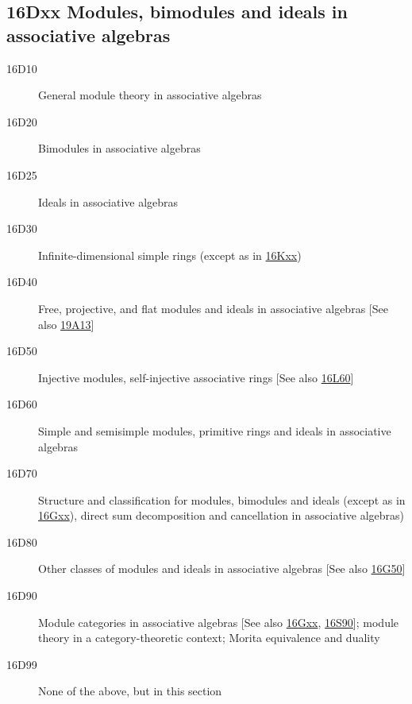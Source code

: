 \subsection*{16Dxx  Modules, bimodules and ideals in associative algebras}\label{16Dxx}
\begin{description}  
\item [16D10]\label{16D10} General module theory in associative algebras
\item [16D20]\label{16D20} Bimodules in associative algebras
\item [16D25]\label{16D25} Ideals in associative algebras
\item [16D30]\label{16D30} Infinite-dimensional simple rings (except as in \hyperref[16Kxx]{16Kxx})
\item [16D40]\label{16D40} Free, projective, and flat modules and ideals in associative algebras [See also \hyperref[19A13]{19A13}]
\item [16D50]\label{16D50} Injective modules, self-injective associative rings [See also \hyperref[16L60]{16L60}]
\item [16D60]\label{16D60} Simple and semisimple modules, primitive rings and ideals in associative algebras
\item [16D70]\label{16D70} Structure and classification for modules, bimodules and ideals (except as in \hyperref[16Gxx]{16Gxx}), direct sum decomposition and cancellation in associative algebras)
\item [16D80]\label{16D80} Other classes of modules and ideals in associative algebras [See also \hyperref[16G50]{16G50}]
\item [16D90]\label{16D90} Module categories in associative algebras [See also \hyperref[16Gxx]{16Gxx}, \hyperref[16S90]{16S90}]; module theory in a category-theoretic context; Morita equivalence and duality
\item [16D99]\label{16D99} None of the above, but in this section
\end{description}
